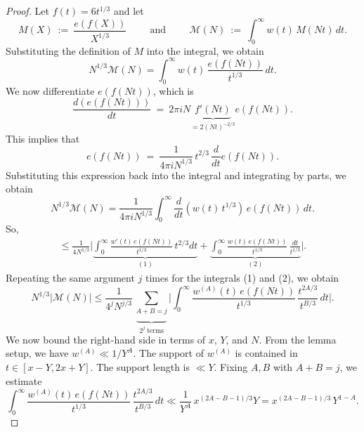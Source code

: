 \documentclass[10pt,a4paper]{amsart}
\begin{document}
\begin{proof}
Let $f(t) = 6t^{1/3}$ and let
\begin{equation*}
    M(X)\ :=\ \frac{e(f(X))}{X^{1/3}} \hspace{1cm} \text{and} \hspace{1cm} \mathcal{M}(N)\ :=\ \int_{0}^{\infty} w(t)\, M(Nt)\, dt.
\end{equation*}
Substituting the definition of $M$ into the integral, we obtain
\begin{equation*}
    N^{1/3} \mathcal{M}(N) = \int_{0}^{\infty} w(t)\, \frac{e(f(Nt))}{t^{1/3}}\, dt.
\end{equation*}
We now differentiate $e(f(Nt))$, which is
\begin{equation*}
     \frac{d(e(f(Nt)))}{dt}\ =\ 2\pi iN \underbrace{f'(Nt)}_{=2(Nt)^{-2/3}} e(f(Nt)).
\end{equation*}
This implies that
\begin{equation*}
    e(f(Nt))\ =\ \frac{1}{4\pi i N^{1/3}}\, t^{2/3}\, \frac{d}{dt}e(f(Nt)).
\end{equation*}
Substituting this expression back into the integral and integrating by parts, we obtain
\begin{equation*}
    N^{1/3} \mathcal{M}(N) = \frac{1}{4\pi i N^{1/3}} \int_{0}^{\infty} \frac{d}{dt}(w(t)\, t^{1/3})\, e(f(Nt))\, dt.
\end{equation*}
So,
\begin{align*}
    \leq \frac{1}{4N^{1/3}} \Big| \underbrace{\int_{0}^{\infty} \frac{w'(t)\, e(f(Nt))}{t^{1/3}}\, t^{2/3} dt}_{(1)} + \underbrace{\int_{0}^{\infty} \frac{w(t)\, e(f(Nt))}{t^{1/3}}\, \frac{dt}{t^{1/3}}}_{(2)} \Big|.
\end{align*}
Repeating the same argument $j$ times for the integrals (1) and (2), we obtain
\begin{equation}\label{boundlemma5}
    N^{1/3} |\mathcal{M}(N)| \leq \frac{1}{4^j N^{j/3}}\, \underset{2^j\ \text{terms}}{\underbrace{\sum_{A+B=j}}} \Big| \int_{0}^{\infty} \frac{w^{(A)}(t)\, e(f(Nt))}{t^{1/3}}\, \frac{t^{2A/3}}{t^{B/3}}\, dt \Big|.
\end{equation}
We now bound the right-hand side in terms of $x$, $Y$, and $N$. From the lemma setup, we have $w^{(A)} \ll 1/Y^A$. The support of $w^{(A)}$ is contained in $t \in [x - Y, 2x + Y]$. The support length is $\ll Y$. Fixing $A, B$ with $A + B = j$, we estimate
\begin{equation*}
    \int_{0}^{\infty} \frac{w^{(A)}(t)\, e(f(Nt))}{t^{1/3}}\, \frac{t^{2A/3}}{t^{B/3}}\, dt \ll \frac{1}{Y^A}\, x^{(2A - B - 1)/3} Y = x^{(2A - B - 1)/3}\, Y^{1 - A}.

\end{equation*}
\end{proof}
\end{document}
